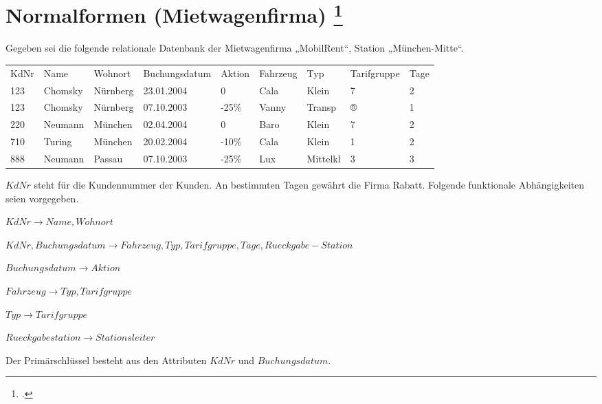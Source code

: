 \documentclass{lehramt-informatik-haupt}
\begin{document}
%

\section{Normalformen (Mietwagenfirma)
\footcite[Seite 2, Aufgabe 3: Normalformen]{db:pu:4}
}

Gegeben sei die folgende relationale Datenbank der Mietwagenfirma
„MobilRent“, Station „München-Mitte“.

\renewcommand{\labelenumi}{(\alph{enumi})}

\begin{tabular}{lllllllll}
KdNr & Name & Wohnort & Buchungsdatum & Aktion & Fahrzeug & Typ & Tarifgruppe & Tage
\\

123 & Chomsky & Nürnberg & 23.01.2004 & 0 & Cala & Klein & 7 & 2
\\

123 & Chomsky & Nürnberg & 07.10.2003 & -25\% & Vanny & Transp & ® & 1
\\

220 & Neumann & München & 02.04.2004 & 0 & Baro & Klein & 7 & 2
\\

710 & Turing & München & 20.02.2004 & -10\% & Cala & Klein & 1 & 2
\\

888 & Neumann & Passau & 07.10.2003 & -25\% & Lux & Mittelkl & 3 & 3
\\
\end{tabular}

$KdNr$ steht für die Kundennummer der Kunden. An bestimmten Tagen
gewährt die Firma Rabatt. Folgende funktionale Abhängigkeiten seien
vorgegeben.

$KdNr \rightarrow Name, Wohnort$

$KdNr, Buchungsdatum \rightarrow Fahrzeug, Typ, Tarifgruppe, Tage, Rueckgabe-Station$

$Buchungsdatum \rightarrow Aktion$

$Fahrzeug \rightarrow Typ, Tarifgruppe$

$Typ \rightarrow Tarifgruppe$

$Rueckgabestation \rightarrow Stationsleiter$

Der Primärschlüssel besteht aus den Attributen $KdNr$ und
$Buchungsdatum$.
\end{document}
